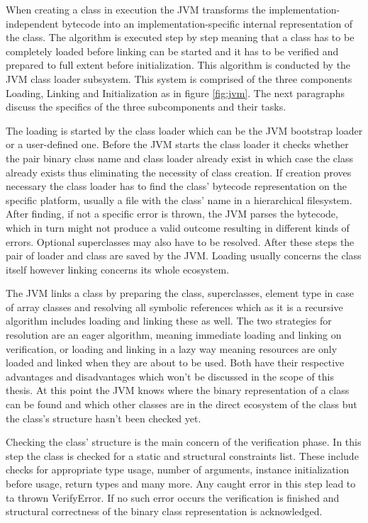 When creating a class in execution the JVM transforms the implementation-independent bytecode into an implementation-specific internal representation of the class. The algorithm is executed step by step meaning that a class has to be completely loaded before linking can be started and it has to be verified and prepared to full extent before initialization. This algorithm is conducted by the JVM class loader subsystem. This system is comprised of the three components Loading, Linking and Initialization as in figure \ref{fig:jvm}. The next paragraphs discuss the specifics of the three subcomponents and their tasks.

The loading is started by the class loader which can be the JVM bootstrap loader or a user-defined one. Before the JVM starts the class loader it checks whether the pair binary class name and class loader already exist in which case the class already exists thus eliminating the necessity of class creation. If creation proves necessary the class loader has to find the class' bytecode representation on the specific platform, usually a file with the class' name in a hierarchical filesystem. After finding, if not a specific error is thrown, the JVM parses the bytecode, which in turn might not produce a  valid outcome resulting in different kinds of errors. Optional superclasses may also have to be resolved. After these steps the pair of loader and class are saved by the JVM. Loading usually concerns the class itself however linking concerns its whole ecosystem. \cite{Lindholm}

The JVM links a class by preparing the class, superclasses, element type in case of array classes and resolving all symbolic references which as it is a recursive algorithm includes loading and linking these as well. The two strategies for resolution are an eager algorithm, meaning immediate loading and linking on verification, or loading and linking in a lazy way meaning resources are only loaded and linked when they are about to be used. Both have their respective advantages and disadvantages which won't be discussed in the scope of this thesis. At this point the JVM knows where the binary representation of a class can be found and which other classes are in the direct ecosystem of the class but the class's structure hasn't been checked yet. \cite{Lindholm}

Checking the class' structure is the main concern of the verification phase. In this step the class is checked for a static and structural constraints list. These include checks for appropriate type usage, number of arguments, instance initialization before usage, return types and many more. Any caught error in this step lead to ta thrown VerifyError. If no such error occurs the verification is finished and structural correctness of the binary class representation is acknowledged. \cite{Lindholm}

